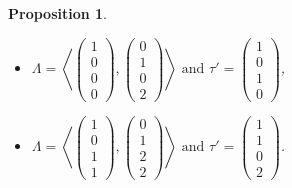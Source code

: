 \documentclass{alggeom}
\newcommand{\vect}[1]{\left( \begin{smallmatrix} #1 \end{smallmatrix} \right)}
\newcommand{\plan}[2]{\left< \vect{ #1 }, \vect{ #2 } \right>}
\theoremstyle{plain}
\newtheorem{prop}[theorem]{Proposition}
\theoremstyle{definition}
\theoremstyle{remark}
\begin{document}
\begin{prop}
\begin{itemize}
\item[(viii)]
$\Lambda=\plan{1\\0\\0\\0}{0\\1\\0\\2} \text{ and } \tau' = \vect{1\\0\\1\\0}$,

\item[(ix)]
$\Lambda=\plan{1\\0\\1\\1}{0\\1\\2\\2} \text{ and } \tau' = \vect{1\\1\\0\\2}$.
\end{itemize}
\end{prop}
\end{document}
